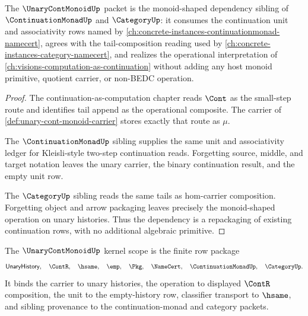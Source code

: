 \begin{theorem}
\label{thm:unary-cont-monoid-sibling-dependency}
The $\UnaryContMonoidUp$ packet is the monoid-shaped dependency sibling of $\ContinuationMonadUp$ and $\CategoryUp$: it consumes the continuation unit and associativity rows named by \autoref{ch:concrete-instances-continuationmonad-namecert}, agrees with the tail-composition reading used by \autoref{ch:concrete-instances-category-namecert}, and realizes the operational interpretation of \autoref{ch:visions-computation-as-continuation} without adding any host monoid primitive, quotient carrier, or non-BEDC operation.
\end{theorem}
\begin{proof}
The continuation-as-computation chapter reads $\Cont$ as the small-step route and identifies tail append as the operational composite. The carrier of \autoref{def:unary-cont-monoid-carrier} stores exactly that route as $\mu$.

The $\ContinuationMonadUp$ sibling supplies the same unit and associativity ledger for Kleisli-style two-step continuation reads. Forgetting source, middle, and target notation leaves the unary carrier, the binary continuation result, and the empty unit row.

The $\CategoryUp$ sibling reads the same tails as hom-carrier composition. Forgetting object and arrow packaging leaves precisely the monoid-shaped operation on unary histories. Thus the dependency is a repackaging of existing continuation rows, with no additional algebraic primitive.
\end{proof}

\begin{definition}
\label{def:unary-cont-monoid-kernel-scope}
The $\UnaryContMonoidUp$ kernel scope is the finite row package
$$
\mathsf{UnaryHistory},\quad \ContR,\quad \hsame,\quad \emp,\quad \Pkg,\quad \NameCert,\quad \ContinuationMonadUp,\quad \CategoryUp.
$$
It binds the carrier to unary histories, the operation to displayed $\ContR$ composition, the unit to the empty-history row, classifier transport to $\hsame$, and sibling provenance to the continuation-monad and category packets.
\end{definition}

